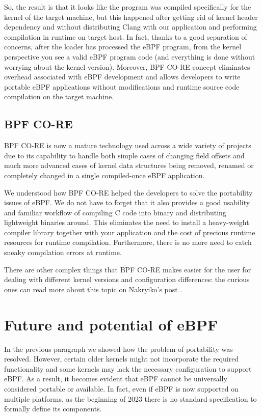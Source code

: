 So, the result is that it looks like the program was compiled specifically for the kernel of the target machine, but this happened after getting rid of kernel header dependency and without distributing Clang with our application and performing compilation in runtime on target host.
In fact, thanks to a good separation of concerns, after the loader has processed the eBPF program, from the kernel perspective you see a valid eBPF program code (and everything is done without worrying about the kernel version).
Moreover, BPF CO-RE concept eliminates overhead associated with eBPF development and allows developers to write portable eBPF applications without modifications and runtime source code compilation on the target machine.

\subsection{BPF CO-RE}

BPF CO-RE is now a mature technology used across a wide variety of projects due to its capability to handle both simple cases of changing field offsets and much more advanced cases of kernel data structures being removed, renamed or completely changed in a single compiled-once eBPF application.

We understood how BPF CO-RE helped the developers to solve the portability issues of eBPF.
We do not have to forget that it also provides a good usability and familiar workflow of compiling C code into binary and distributing lightweight binaries around. 
This eliminates the need to install a heavy-weight compiler library together with your application and the cost of precious runtime resources for runtime compilation. 
Furthermore, there is no more need to catch sneaky compilation errors at runtime.

There are other complex things that BPF CO-RE makes easier for the user for dealing with different kernel versions and configuration differences: the curious ones can read more about this topic on Nakryiko's post \cite{ANCOREPost}.

\section{Future and potential of eBPF}

In the previous paragraph we showed how the problem of portability was resolved.
However, certain older kernels might not incorporate the required functionality and some kernels may lack the necessary configuration to support eBPF. 
As a result, it becomes evident that eBPF cannot be universally considered portable or available.
In fact, even if eBPF is now supported on multiple platforms, as the beginning of 2023 there is no standard specification to formally define its components. 


